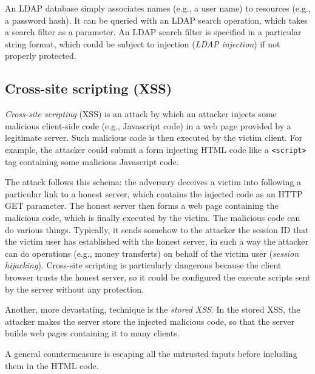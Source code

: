 \documentclass[a4paper,12pt]{article}
\begin{document}
An LDAP database simply associates names (e.g., a user name) to resources (e.g., a password hash). It can be queried with an LDAP search operation, which takes a search filter as a parameter. An LDAP search filter is specified in a particular string format, which could be subject to injection (\textit{LDAP injection}) if not properly protected.

\subsection{Cross-site scripting (XSS)}
\textit{Cross-site scripting} (XSS) is an attack by which an attacker injects some malicious client-side code (e.g., Javascript code) in a web page provided by a legitimate server. Such malicious code is then executed by the victim client. For example, the attacker could submit a form injecting HTML code like a \texttt{<script>} tag containing some malicious Javascript code.

The attack follows this schema: the adversary deceives a victim into following a particular link to a honest server, which contains the injected code as an HTTP GET parameter. The honest server then forms a web page containing the malicious code, which is finally executed by the victim. The malicious code can do various things. Typically, it sends somehow to the attacker the session ID that the victim user has established with the honest server, in such a way the attacker can do operations (e.g., money transferts) on behalf of the victim user (\textit{session hijacking}). Cross-site scripting is particularly dangerous because the client browser trusts the honest server, so it could be configured the execute scripts sent by the server without any protection.

Another, more devastating, technique is the \textit{stored XSS}. In the stored XSS, the attacker makes the server store the injected malicious code, so that the server builds web pages containing it to many clients.

A general countermeasure is escaping all the untrusted inputs before including them in the HTML code.
\end{document}
